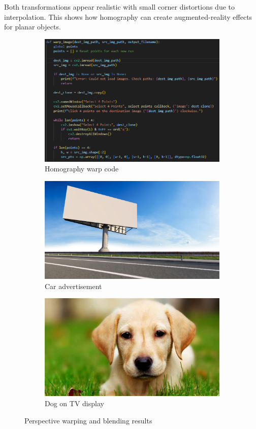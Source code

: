 \documentclass[11pt,a4paper]{article}
\begin{document}
Both transformations appear realistic with small corner distortions due to interpolation.  
This shows how homography can create augmented-reality effects for planar objects.

\begin{figure}[H]\centering
\begin{subfigure}{0.31\textwidth}
\includegraphics[width=\linewidth]{images/q3_code.png}
\caption{Homography warp code}
\end{subfigure}
\begin{subfigure}{0.31\textwidth}
\includegraphics[width=\linewidth]{images/bill_board.png}
\caption{Car advertisement}
\end{subfigure}
\begin{subfigure}{0.31\textwidth}
\includegraphics[width=\linewidth]{images/dog.png}
\caption{Dog on TV display}
\end{subfigure}
\caption{Perspective warping and blending results}
\end{figure}
\end{document}
